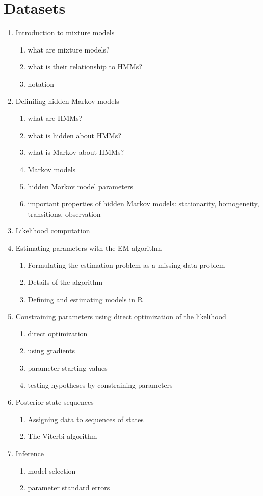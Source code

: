  
\newpage
\section{Datasets}

\begin{enumerate} 
	\item Introduction to mixture models
	\begin{enumerate}
		\item what are mixture models? 
		\item what is their relationship to HMMs?
		\item notation
	\end{enumerate}
	\item Definifing hidden Markov models
	\begin{enumerate}
		\item what are HMMs?
		\item what is hidden about HMMs?
		\item what is Markov about HMMs?
		\item Markov models
		\item hidden Markov model parameters
		\item important properties of hidden Markov models: 
		stationarity, homogeneity, transitions, observation
	\end{enumerate}
	\item Likelihood computation
	\item Estimating parameters with the EM algorithm
	\begin{enumerate}
		\item Formulating the estimation problem as a missing data 
		problem
		\item Details of the algorithm
		\item Defining and estimating models in R
	\end{enumerate}
	\item Constraining parameters using direct optimization of the 
	likelihood
	\begin{enumerate}
		\item direct optimization
		\item using gradients
		\item parameter starting values
		\item testing hypotheses by constraining parameters
	\end{enumerate}
	\item Posterior state sequences
	\begin{enumerate}
		\item Assigning data to sequences of states
		\item The Viterbi algorithm
	\end{enumerate}
	\item Inference
	\begin{enumerate}
		\item model selection
		\item parameter standard errors
	\end{enumerate}
\end{enumerate}

